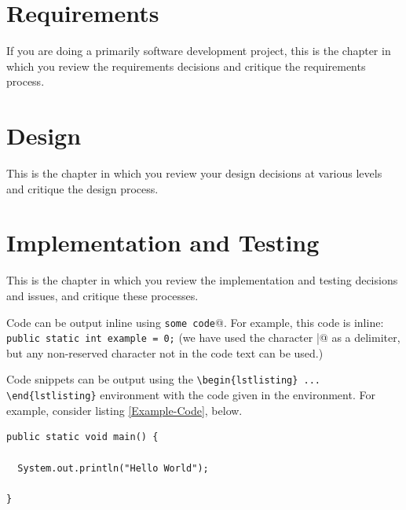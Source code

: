 \documentclass[12pt,a4paper]{report}
\begin{document}
\chapter{Requirements}

If you are doing a primarily software development project, this is the chapter in which you review the requirements decisions and critique the requirements process.

\chapter{Design}

This is the chapter in which you review your design decisions at various
levels and critique the design process.

\chapter{Implementation and Testing}

This is the chapter in which you review the implementation and testing decisions and issues, and critique these processes.

Code can be output inline using \verb@\lstinline|some code|@.  For example, this code is inline: \lstinline|public static int example = 0;| (we have used the character \verb@|@ as a delimiter, but any non-reserved character not in the code text can be used.)

Code snippets can be output using the \verb|\begin{lstlisting} ... \end{lstlisting}|
environment with the code given in the environment. For example, consider listing \ref{Example-Code}, below.

\begin{lstlisting}[breaklines,breakatwhitespace,caption={Example code},label=Example-Code]
public static void main() {

  System.out.println("Hello World");

}
\end{lstlisting}
\end{document}
